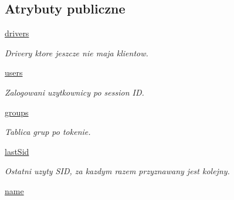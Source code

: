 \subsection*{Atrybuty publiczne}
\begin{DoxyCompactItemize}
\item 
\hyperlink{class_serv_1_1_user_group_manager_1_1_user_group_manager_a00aa453d586337ce2692166c666a1817}{drivers}
\begin{DoxyCompactList}\small\item\em Drivery ktore jeszcze nie maja klientow. \item\end{DoxyCompactList}\item 
\hypertarget{class_serv_1_1_user_group_manager_1_1_user_group_manager_ab41620628a204c943cd30a8f836eddd0}{
\hyperlink{class_serv_1_1_user_group_manager_1_1_user_group_manager_ab41620628a204c943cd30a8f836eddd0}{users}}
\label{class_serv_1_1_user_group_manager_1_1_user_group_manager_ab41620628a204c943cd30a8f836eddd0}

\begin{DoxyCompactList}\small\item\em Zalogowani uzytkownicy po session ID. \item\end{DoxyCompactList}\item 
\hypertarget{class_serv_1_1_user_group_manager_1_1_user_group_manager_a4da728a66a4115432bdc2057fd3e92fa}{
\hyperlink{class_serv_1_1_user_group_manager_1_1_user_group_manager_a4da728a66a4115432bdc2057fd3e92fa}{groups}}
\label{class_serv_1_1_user_group_manager_1_1_user_group_manager_a4da728a66a4115432bdc2057fd3e92fa}

\begin{DoxyCompactList}\small\item\em Tablica grup po tokenie. \item\end{DoxyCompactList}\item 
\hypertarget{class_serv_1_1_user_group_manager_1_1_user_group_manager_a97c7d967f8ebfe883963ff38bee5ecaf}{
\hyperlink{class_serv_1_1_user_group_manager_1_1_user_group_manager_a97c7d967f8ebfe883963ff38bee5ecaf}{lastSid}}
\label{class_serv_1_1_user_group_manager_1_1_user_group_manager_a97c7d967f8ebfe883963ff38bee5ecaf}

\begin{DoxyCompactList}\small\item\em Ostatni uzyty SID, za kazdym razem przyznawany jest kolejny. \item\end{DoxyCompactList}\item 
\hypertarget{class_serv_1_1_user_group_manager_1_1_user_group_manager_ac2e922b108e77474d9daab6be8055436}{
\hyperlink{class_serv_1_1_user_group_manager_1_1_user_group_manager_ac2e922b108e77474d9daab6be8055436}{name}}
\label{class_serv_1_1_user_group_manager_1_1_user_group_manager_ac2e922b108e77474d9daab6be8055436}


\end{DoxyCompactItemize}
